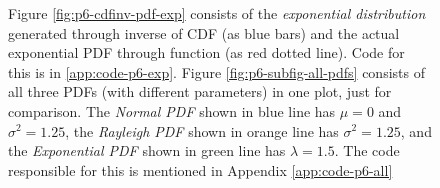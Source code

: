 \documentclass[main.tex]{article}
\begin{document}
\begin{figure}
        Figure \ref{fig:p6-cdfinv-pdf-exp} consists of the \emph{exponential distribution} generated through inverse of CDF (as blue bars) and the actual exponential PDF through function (as red dotted line). Code for this is in \ref{app:code-p6-exp}.
        Figure \ref{fig:p6-subfig-all-pdfs} consists of all three PDFs (with different parameters) in one plot, just for comparison. The \emph{Normal PDF} shown in blue line has $\mu=0$ and $\sigma^2=1.25$, the \emph{Rayleigh PDF} shown in orange line has $\sigma^2=1.25$, and the \emph{Exponential PDF} shown in green line has $\lambda=1.5$. The code responsible for this is mentioned in Appendix \ref{app:code-p6-all}
        \label{fig:p6-cdfinv-pdf}
    \end{figure}
\end{document}
